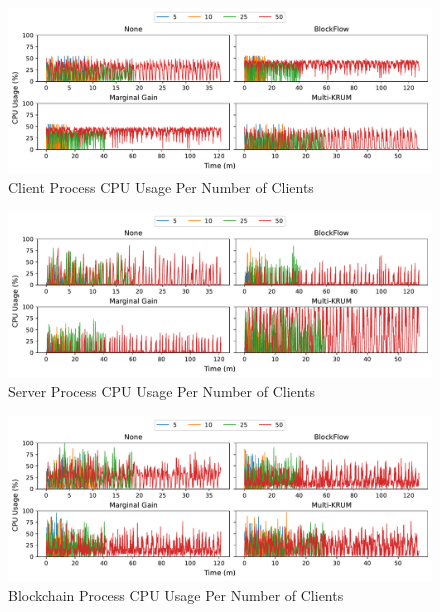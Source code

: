 \clearpage

\begin{figure}[!h]
    \centering
    \includegraphics[width=\textwidth]{graphics/clients/cpu_client.pdf}
    \caption{Client Process CPU Usage Per Number of Clients}
    \label{fig:cpu_clients_clients}
\end{figure}

\begin{figure}[!h]
    \centering
    \includegraphics[width=\textwidth]{graphics/clients/cpu_server.pdf}
    \caption{Server Process CPU Usage Per Number of Clients}
    \label{fig:cpu_clients_servers}
\end{figure}

\begin{figure}[!h]
    \centering
    \includegraphics[width=\textwidth]{graphics/clients/cpu_miner.pdf}
    \caption{Blockchain Process CPU Usage Per Number of Clients}
    \label{fig:cpu_clients_miners}
\end{figure}


